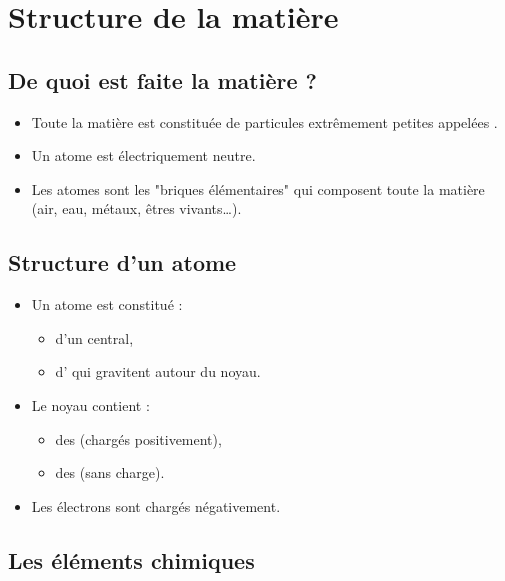 \documentclass[12pt]{article}
\begin{document}


\section{Structure de la matière}

\subsection{De quoi est faite la matière ?}

\begin{itemize}
    \item Toute la matière est constituée de particules extrêmement petites appelées .
    \item Un atome est électriquement neutre.
    \item Les atomes sont les "briques élémentaires" qui composent toute la matière (air, eau, métaux, êtres vivants…).
\end{itemize}

\subsection{Structure d’un atome}

\begin{itemize}
    \item Un atome est constitué :
    \begin{itemize}
        \item d’un  central,
        \item d’ qui gravitent autour du noyau.
    \end{itemize}
    
    \item Le noyau contient :
    \begin{itemize}
        \item des  (chargés positivement),
        \item des  (sans charge).
    \end{itemize}
    
    \item Les électrons sont chargés négativement.
\end{itemize}

\subsection{Les éléments chimiques}
\end{document}
